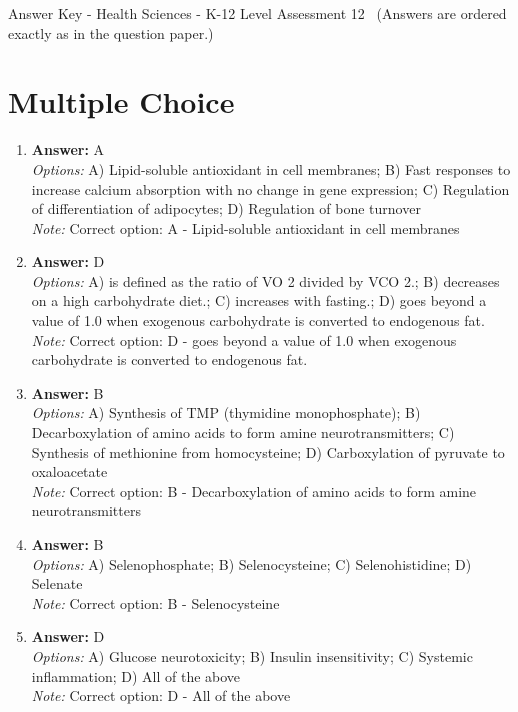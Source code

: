 \documentclass[12pt]{article}
\begin{document}
\begin{center}
Answer Key - Health Sciences - K-12 Level Assessment 12 \
\small (Answers are ordered exactly as in the question paper.)
\end{center}

\section*{Multiple Choice}
\begin{enumerate}[label=\arabic*.]
\item \textbf{Answer:} A
\\ \textit{Options:} A) Lipid-soluble antioxidant in cell membranes; B) Fast responses to increase calcium absorption with no change in gene expression; C) Regulation of differentiation of adipocytes; D) Regulation of bone turnover
\\ \textit{Note:} Correct option: A - Lipid-soluble antioxidant in cell membranes
\item \textbf{Answer:} D
\\ \textit{Options:} A) is defined as the ratio of VO 2 divided by VCO 2.; B) decreases on a high carbohydrate diet.; C) increases with fasting.; D) goes beyond a value of 1.0 when exogenous carbohydrate is converted to endogenous fat.
\\ \textit{Note:} Correct option: D - goes beyond a value of 1.0 when exogenous carbohydrate is converted to endogenous fat.
\item \textbf{Answer:} B
\\ \textit{Options:} A) Synthesis of TMP (thymidine monophosphate); B) Decarboxylation of amino acids to form amine neurotransmitters; C) Synthesis of methionine from homocysteine; D) Carboxylation of pyruvate to oxaloacetate
\\ \textit{Note:} Correct option: B - Decarboxylation of amino acids to form amine neurotransmitters
\item \textbf{Answer:} B
\\ \textit{Options:} A) Selenophosphate; B) Selenocysteine; C) Selenohistidine; D) Selenate
\\ \textit{Note:} Correct option: B - Selenocysteine
\item \textbf{Answer:} D
\\ \textit{Options:} A) Glucose neurotoxicity; B) Insulin insensitivity; C) Systemic inflammation; D) All of the above
\\ \textit{Note:} Correct option: D - All of the above
\end{enumerate}
\end{document}
